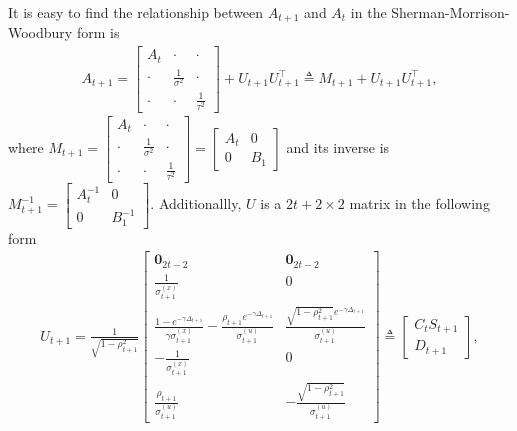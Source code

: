 It is easy to find the relationship between $A_{t+1}$ and  $A_{t}$ in the Sherman-Morrison-Woodbury form is 
\begin{align*} A_{t+1} = 
\begin{bmatrix}
A_t & \cdot & \cdot  \\ \cdot &\frac{1}{\sigma^2} &\cdot  \\ \cdot  & \cdot  & \frac{1}{\tau^2} 
\end{bmatrix} + U_{t+1}U_{t+1}^\top \triangleq M_{t+1}  + U_{t+1}U_{t+1}^\top,
\end{align*}
where $M_{t+1} = \begin{bmatrix}
A_t & \cdot & \cdot  \\ \cdot &\frac{1}{\sigma^2} &\cdot  \\ \cdot  & \cdot  & \frac{1}{\tau^2}
\end{bmatrix}  = \begin{bmatrix}
A_t & 0 \\ 0 & B_1
\end{bmatrix}$ 
and its inverse is $M_{t+1}^{-1} =\begin{bmatrix}
A_t^{-1} & 0 \\ 0 & B_1^{-1}
\end{bmatrix}$. Additionallly, $U$ is a $2t+2 \times 2$ matrix in the following form 
\begin{align*}
U_{t+1} = \frac{1}{\sqrt{ 1-\rho_{t+1}^2} } \begin{bmatrix}
\mathbf{0}_{2t-2} & \mathbf{0}_{2t-2}  \\ \frac{1}{\sigma_{t+1}^{(x)}}& 0 \\
\frac{1-e^{-\gamma \Delta_{t+1}}}{\gamma \sigma_{t+1}^{(x)}}-\frac{\rho_{t+1} e^{-\gamma\Delta_{t+1}}}{\sigma_{t+1}^{(u)}} & \frac{\sqrt{1-\rho_{t+1}^2}e^{-\gamma\Delta_{t+1}}}{\sigma_{t+1}^{(u)}} \\
-\frac{1}{\sigma_{t+1}^{(x)}} & 0 \\
\frac{\rho_{t+1}}{\sigma_{t+1}^{(u)}} & -\frac{\sqrt{1-\rho_{t+1}^2}}{\sigma_{t+1}^{(u)}}
\end{bmatrix} \triangleq  \begin{bmatrix}
C_t S_{t+1} \\ D_{t+1}
\end{bmatrix},
\end{align*}
